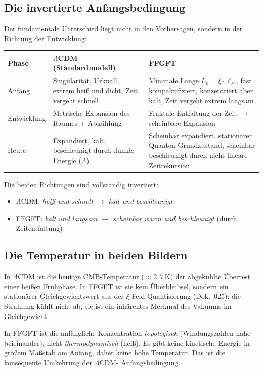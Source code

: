 \subsection*{Die invertierte Anfangsbedingung}

Der fundamentale Unterschied liegt nicht in den Vorhersagen, sondern in
der Richtung der Entwicklung:

\begin{center}
\begin{tabular}{p{2.3cm}p{5.3cm}p{5.3cm}}
\toprule
\textbf{Phase} & \textbf{$\Lambda$CDM (Standardmodell)} & \textbf{FFGFT} \\
\midrule
Anfang &
  Singularität, Urknall, extrem heiß und dicht, Zeit vergeht schnell &
  Minimale Länge $L_0 = \xi \cdot \ell_P$, fast kompaktifiziert,
  konzentriert aber kalt, Zeit vergeht extrem langsam \\
\addlinespace
Entwicklung &
  Metrische Expansion des Raumes + Abkühlung &
  Fraktale Entfaltung der Zeit $\to$ scheinbare Expansion \\
\addlinespace
Heute &
  Expandiert, kalt, beschleunigt durch dunkle Energie ($\Lambda$) &
  Scheinbar expandiert, stationärer Quanten-Grundzustand, scheinbar
  beschleunigt durch nicht-lineare Zeitrekursion \\
\bottomrule
\end{tabular}
\end{center}

Die beiden Richtungen sind vollständig invertiert:
\begin{itemize}
  \item $\Lambda$CDM: \emph{heiß und schnell} $\to$ \emph{kalt und beschleunigt}
  \item FFGFT: \emph{kalt und langsam} $\to$ \emph{scheinbar warm und beschleunigt}
        (durch Zeitentfaltung)
\end{itemize}

\subsection*{Die Temperatur in beiden Bildern}

In $\Lambda$CDM ist die heutige CMB-Temperatur ($\approx 2{,}7$\,K) der
abgekühlte Überrest einer heißen Frühphase. In FFGFT ist sie kein
Überbleibsel, sondern ein stationärer Gleichgewichtswert aus der
$\xi$-Feld-Quantisierung (Dok.~025): die Strahlung kühlt nicht ab, sie
ist ein inhärentes Merkmal des Vakuums im Gleichgewicht.

In FFGFT ist die anfängliche Konzentration \emph{topologisch}
(Windungszahlen nahe beieinander), nicht \emph{thermodynamisch} (heiß).
Es gibt keine kinetische Energie in großem Maßstab am Anfang, daher keine
hohe Temperatur. Das ist die konsequente Umkehrung der $\Lambda$CDM-
Anfangsbedingung.

